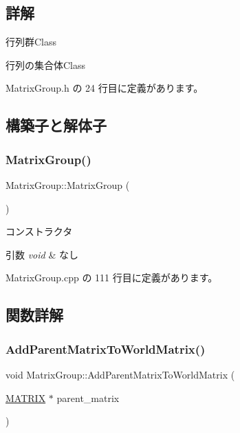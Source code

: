 \subsection{詳解}
行列群\+Class 

行列の集合体\+Class 

 Matrix\+Group.\+h の 24 行目に定義があります。



\subsection{構築子と解体子}
\mbox{\label{class_matrix_group_accbaedd4ff498f5f5c9dd6b586724760}} 
\subsubsection{\texorpdfstring{Matrix\+Group()}{MatrixGroup()}}
{\footnotesize\ttfamily Matrix\+Group\+::\+Matrix\+Group (\begin{DoxyParamCaption}{ }\end{DoxyParamCaption})}



コンストラクタ 


\begin{DoxyParams}{引数}
{\em void} & なし \\
\hline
\end{DoxyParams}


 Matrix\+Group.\+cpp の 111 行目に定義があります。



\subsection{関数詳解}
\mbox{\label{class_matrix_group_a79162f8fa1bab75e5e9dd505c1c08f13}} 
\subsubsection{\texorpdfstring{Add\+Parent\+Matrix\+To\+World\+Matrix()}{AddParentMatrixToWorldMatrix()}}
{\footnotesize\ttfamily void Matrix\+Group\+::\+Add\+Parent\+Matrix\+To\+World\+Matrix (\begin{DoxyParamCaption}\item[{\mbox{\hyperlink{_matrix_8h_a032295cd9fb1b711757c90667278e744}{M\+A\+T\+R\+IX}} $\ast$}]{parent\+\_\+matrix }\end{DoxyParamCaption})}



